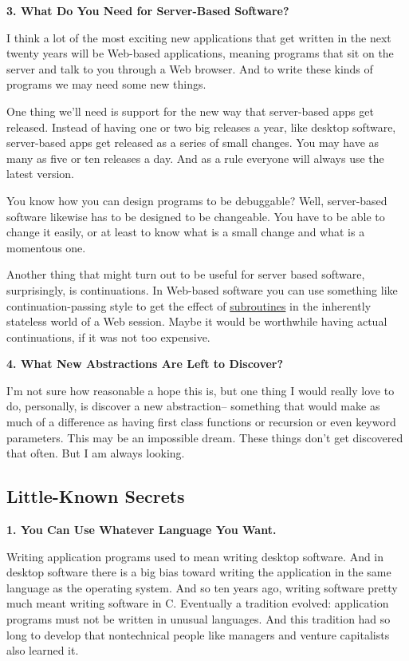 \textbf{3. What Do You Need for Server-Based Software?}

I think a lot of the most exciting new applications that get written in
the next twenty years will be Web-based applications, meaning programs
that sit on the server and talk to you through a Web browser. And to
write these kinds of programs we may need some new things.

One thing we'll need is support for the new way that server-based apps
get released. Instead of having one or two big releases a year, like
desktop software, server-based apps get released as a series of small
changes. You may have as many as five or ten releases a day. And as a
rule everyone will always use the latest version.

You know how you can design programs to be debuggable? Well,
server-based software likewise has to be designed to be changeable. You
have to be able to change it easily, or at least to know what is a small
change and what is a momentous one.

Another thing that might turn out to be useful for server based
software, surprisingly, is continuations. In Web-based software you can
use something like continuation-passing style to get the effect of
\href{lwba.html}{subroutines} in the inherently stateless world of a Web
session. Maybe it would be worthwhile having actual continuations, if it
was not too expensive.

\textbf{4. What New Abstractions Are Left to Discover?}

I'm not sure how reasonable a hope this is, but one thing I would really
love to do, personally, is discover a new abstraction-- something that
would make as much of a difference as having first class functions or
recursion or even keyword parameters. This may be an impossible dream.
These things don't get discovered that often. But I am always looking.

\subsection{Little-Known Secrets}\label{little-known-secrets}

\textbf{1. You Can Use Whatever Language You Want.}

Writing application programs used to mean writing desktop software. And
in desktop software there is a big bias toward writing the application
in the same language as the operating system. And so ten years ago,
writing software pretty much meant writing software in C. Eventually a
tradition evolved: application programs must not be written in unusual
languages. And this tradition had so long to develop that nontechnical
people like managers and venture capitalists also learned it.

